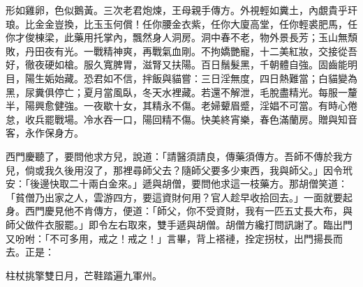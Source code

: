 \begin{showcontents}{}
形如雞卵，色似鵝黃。三次老君炮煉，王母親手傳方。外視輕如糞土，內覷貴乎玕琅。比金金豈換，比玉玉何償！任你腰金衣紫，任你大廈高堂，任你輕裘肥馬，任你才俊棟梁，此藥用托掌內，飄然身人洞房。洞中春不老，物外景長芳；玉山無頹敗，丹田夜有光。一戰精神爽，再戰氣血剛。不拘嬌艷寵，十二美紅妝，交接從吾好，徹夜硬如槍。服久寬脾胃，滋腎又扶陽。百日鬚髮黑，千朝體自強。固齒能明目，陽生姤始藏。恐君如不信，拌飯與貓嘗：三日淫無度，四日熱難當；白貓變為黑，尿糞俱停亡；夏月當風臥，冬天水裡藏。若還不解泄，毛脫盡精光。每服一釐半，陽興愈健強。一夜歇十女，其精永不傷。老婦顰眉蹙，淫娼不可當。有時心倦怠，收兵罷戰場。冷水吞一口，陽回精不傷。快美終宵樂，春色滿蘭房。贈與知音客，永作保身方。

西門慶聽了，要問他求方兒，說道：「請醫須請良，傳藥須傳方。吾師不傳於我方兒，倘或我久後用沒了，那裡尋師父去？隨師父要多少東西，我與師父。」因令玳安：「後邊快取二十兩白金來。」遞與胡僧，要問他求這一枝藥方。那胡僧笑道：「貧僧乃出家之人，雲游四方，要這資財何用？官人趁早收拾回去。」一面就要起身。西門慶見他不肯傳方，便道：「師父，你不受資財，我有一匹五丈長大布，與師父做件衣服罷。」即令左右取來，雙手遞與胡僧。胡僧方纔打問訊謝了。臨出門又吩咐：「不可多用，戒之！戒之！」言畢，背上褡褳，拴定拐杖，出門揚長而去。正是：

柱杖挑擎雙日月，芒鞋踏遍九軍州。



\end{showcontents}
